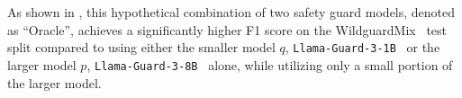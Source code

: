 As shown in , this hypothetical combination of two safety guard models, denoted as ``Oracle'', achieves a significantly higher F1 score on the WildguardMix~\citep{wildguard} test split compared to using either the smaller model $q$, \texttt{Llama-Guard-3-1B}~\citep{metallamaguard3} or the larger model $p$, \texttt{Llama-Guard-3-8B}~\citep{metallamaguard3} alone, while utilizing only a small portion of the larger model.
\begin{table}[t]
    \centering
\vspace{-0.5em}
\caption{
\textbf{Safety F1 score and larger model usage ratio} on the WildGuardMix test split~\cite{wildguard}.}
\label{tab:oracle-prompt}
\vspace{-0.15in}
\end{table}

